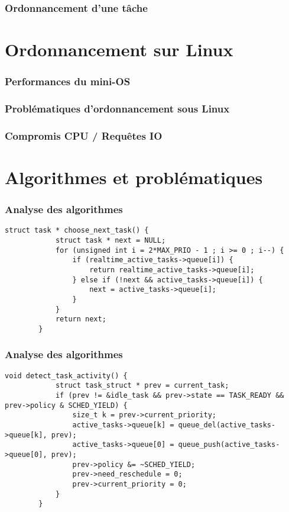\documentclass{beamer}
\begin{document}
\begin{frame}
    \frametitle{Ordonnancement d'une tâche}

\end{frame}

\section{Ordonnancement sur Linux}

\begin{frame}
    \frametitle{Performances du mini-OS}

\end{frame}

\begin{frame}
    \frametitle{Problématiques d'ordonnancement sous Linux}

\end{frame}

\begin{frame}
    \frametitle{Compromis CPU / Requêtes IO}

\end{frame}

\section{Algorithmes et problématiques}

\begin{frame}[fragile]
    \frametitle{Analyse des algorithmes}

    \begin{lstlisting}[caption=Choix de la prochaine tâche à exécuter]
        struct task * choose_next_task() {
            struct task * next = NULL;
            for (unsigned int i = 2*MAX_PRIO - 1 ; i >= 0 ; i--) {
                if (realtime_active_tasks->queue[i]) {
                    return realtime_active_tasks->queue[i];
                } else if (!next && active_tasks->queue[i]) {
                    next = active_tasks->queue[i];
                }
            }
            return next;
        }
    \end{lstlisting}
\end{frame}

\begin{frame}[fragile]
    \frametitle{Analyse des algorithmes}

    \begin{lstlisting}[caption=Détection de l'activité d'une tâche (IO/CPU)]
        void detect_task_activity() {
            struct task_struct * prev = current_task;
            if (prev != &idle_task && prev->state == TASK_READY && prev->policy & SCHED_YIELD) {
                size_t k = prev->current_priority;
                active_tasks->queue[k] = queue_del(active_tasks->queue[k], prev);
                active_tasks->queue[0] = queue_push(active_tasks->queue[0], prev);
                prev->policy &= ~SCHED_YIELD;
                prev->need_reschedule = 0;
                prev->current_priority = 0;
            }
        }
    \end{lstlisting}
\end{frame}
\end{document}
